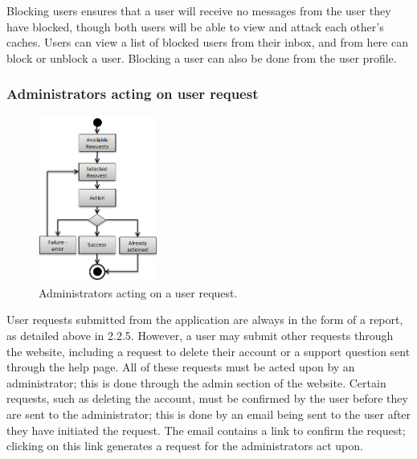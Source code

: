Blocking users ensures that a user will receive no messages from the user they have blocked, though both users will be able to view and attack each other’s caches. Users can view a list of blocked users from their inbox, and from here can block or unblock a user. Blocking a user can  also be done from the user profile.

\subsubsection{Administrators acting on user request}

\begin{figure}
	\vspace{-20pt}
	\begin{center}
	\includegraphics[width=0.35\textwidth]{images/admins_acting}
	\caption{Administrators acting on a user request.}
	\label{admins_acting}
	\end{center}
	\vspace{-40pt}
\end{figure}

User requests submitted from the application are always in the form of a report, as detailed above in 2.2.5. However, a user may submit other requests through the website, including a request to delete their account or a support question sent through the help page. All of these requests must be acted upon by an administrator; this is done through the admin section of the website. Certain requests, such as deleting the account, must be confirmed by the user before they are sent to the administrator; this is done by an email being sent to the user after they have initiated the request. The email contains a link to confirm the request; clicking on this link generates a request for the administrators act upon.

